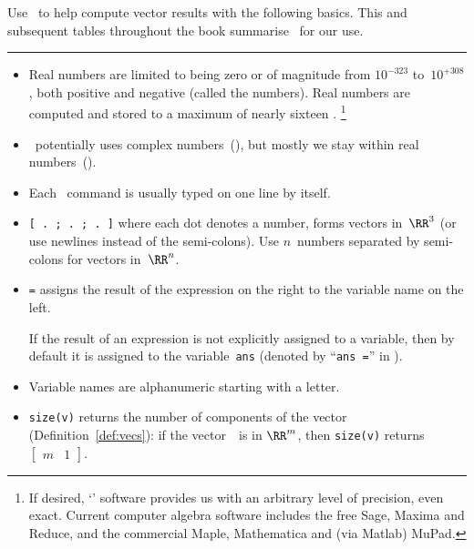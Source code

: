 \begin{table}
\caption{Use \script\ to help compute vector results with the following basics.  This and subsequent tables throughout the book summarise \script\ for our use.
} \label{tbl:mtlbpre}
\hrule
\begin{minipage}{\linewidth}
\begin{itemize}
\item Real numbers are limited to being zero or of magnitude from \(10^{-323}\)  to~\(10^{+308}\), both positive and negative (called the  numbers).
Real numbers are computed and stored to a maximum  of nearly sixteen .%
\footnote{If desired, `' software provides us with an arbitrary level of precision, even exact.
Current computer algebra software includes the free Sage, Maxima and Reduce, and the commercial Maple, Mathematica and (via Matlab) MuPad.}

\item \script\ potentially uses complex numbers~(\CC), but mostly we stay within real numbers~(\RR).

\item Each \script\ command is usually typed on one line by itself.

\item {}\verb|[ . ; . ; . ]| where each dot denotes a number, forms vectors in~\(\RR^3\) (or use newlines instead of the semi-colons).  
Use \(n\)~numbers separated by semi-colons for vectors in~\(\RR^n\).

\item {}\verb|=| assigns the result of the expression on the right to the variable name on the left.

If the result of an expression is not explicitly assigned to a variable, then by default it is assigned to the variable~\verb|ans| (denoted by ``\verb|ans =|'' in \script).

\item Variable names are alphanumeric starting with a letter.

\item {}\verb|size(v)| returns the number of components of the vector (Definition~\ref{def:vecs}): if the vector~\vv\ is in \(\RR^m\), then \verb|size(v)| returns \(\begin{bmatrix} m&1 \end{bmatrix}\).


\end{itemize}
\end{minipage}
\end{table}
